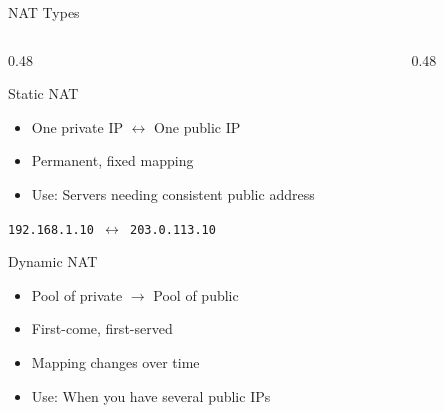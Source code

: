 \documentclass[aspectratio=169]{beamer}  %
\begin{document}
\begin{frame}{NAT Types}
    \begin{columns}[T]
        \begin{column}{0.48\textwidth}
            \begin{block}{Static NAT}
                \small
                \begin{itemize}\setlength{\itemsep}{2pt}
                    \item One private IP $\leftrightarrow$ One public IP
                    \item Permanent, fixed mapping
                    \item Use: Servers needing consistent public address
                \end{itemize}
                
                \vspace{0.2em}
                \centering
                \texttt{192.168.1.10 $\leftrightarrow$ 203.0.113.10}
            \end{block}
            
            \vspace{0.2em}
            \begin{block}{Dynamic NAT}
                \small
                \begin{itemize}\setlength{\itemsep}{2pt}
                    \item Pool of private $\rightarrow$ Pool of public
                    \item First-come, first-served
                    \item Mapping changes over time
                    \item Use: When you have several public IPs
                \end{itemize}
            \end{block}
        \end{column}
        \begin{column}{0.48\textwidth}
            \begin{center}
\end{center}
\end{column}
\end{columns}
\end{frame}
\end{document}
